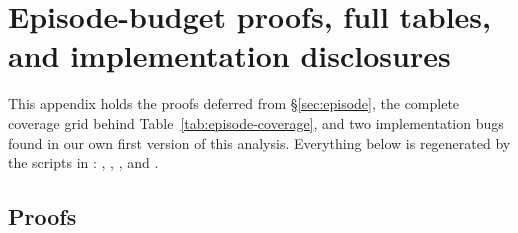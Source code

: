 %

\section{Episode-budget proofs, full tables, and implementation
disclosures}\label{app:episode-proofs}

This appendix holds the proofs deferred from \S\ref{sec:episode}, the complete coverage grid behind
Table~\ref{tab:episode-coverage}, and two implementation bugs found in our own first version of this
analysis. Everything below is regenerated by the scripts in
:
, , , and
.

\subsection{Proofs}

